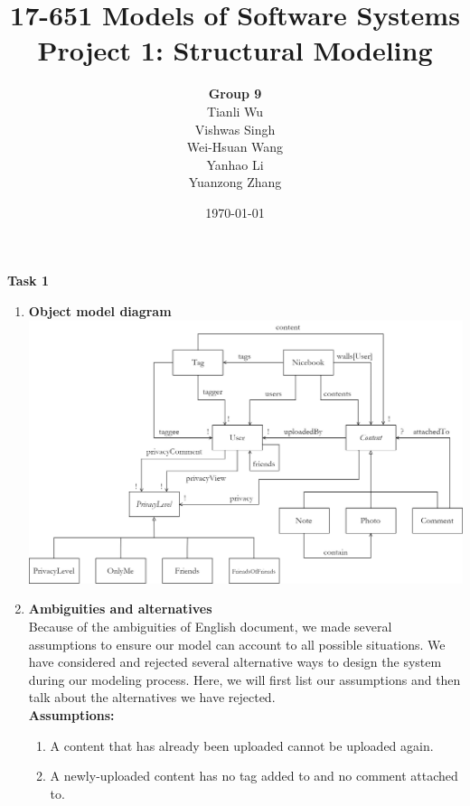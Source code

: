 \documentclass[titlepage]{article}
\begin{document}
\title{17-651 Models of Software Systems\\[1ex] Project 1: Structural Modeling}
\author{
    {\Large\textbf{Group 9}}\\[3ex]
    Tianli Wu\\[1ex]
    Vishwas Singh\\[1ex]
    Wei-Hsuan Wang\\[1ex]
    Yanhao Li\\[1ex]
    Yuanzong Zhang\\[1ex]
}
\date{\today}
\maketitle
{\bf\Large Task 1}
\begin{enumerate}[\bf\large 1.]
    \item {\bf\large Object model diagram}\\
    \includegraphics[width=6in]{nicebook.jpg}
    \item {\bf\large Ambiguities and alternatives}\\[1ex]
    Because of the ambiguities of English document, we made several assumptions to ensure our model can account to all possible situations.
    We have considered and rejected several alternative ways to design the system during our modeling process.
    Here, we will first list our assumptions and then talk about the alternatives we have rejected.
    \\[1ex]\textbf{Assumptions: }
    \begin{enumerate}[1)]
        \item A content that has already been uploaded cannot be uploaded again.
        \item A newly-uploaded content has no tag added to and no comment attached to.

\end{enumerate}
\end{enumerate}
\end{document}
